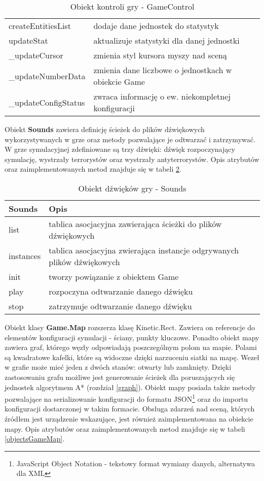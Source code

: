 \begin{table}
\begin{center}
\begin{tabular}{|p{}|p{}|}
	createEntitiesList & dodaje dane jednostek do statystyk\\
	updateStat & aktualizuje statystyki dla danej jednostki\\
	\_updateCursor & zmienia styl kursora myszy nad sceną\\
	\_updateNumberData & zmienia dane liczbowe o jednostkach w obiekcie Game\\
	\_updateConfigStatus & zwraca informację o ew. niekompletnej konfiguracji 
\\\hline
\end{tabular}
\caption {Obiekt kontroli gry - GameControl\label{objectsGameControl}}
\end{center}
\end{table} 

Obiekt \textbf{Sounds} zawiera definicję ścieżek do plików dźwiękowych wykorzystywanych w grze oraz metody pozwalające je odtwarzać i zatrzymywać. W grze symulacyjnej zdefiniowane są trzy dźwięki: dźwięk rozpoczynający symulację, wystrzały terrorystów oraz wystrzały antyterrorystów. Opis atrybutów oraz zaimplementowanych metod znajduje się w tabeli \ref{objectsSounds}. 

\begin{table}
\begin{center}
\begin{tabular}{|p{}|p{}|}
\hline
\textbf{Sounds} & Opis\\\hline		
	list & tablica asocjacyjna zawierająca ścieżki do plików dźwiękowych\\
	instances & tablica asocjacyjna zwierająca instancje odgrywanych plików dźwiękowych
\\\hline
	init & tworzy powiązanie z obiektem Game\\
	play & rozpoczyna odtwarzanie danego dźwięku\\
	stop & zatrzymuje odtwarzanie danego dźwięku
\\\hline
\end{tabular}
\caption {Obiekt dźwięków gry - Sounds\label{objectsSounds}}
\end{center}
\end{table} 

Obiekt klasy \textbf{Game.Map} rozszerza klasę Kinetic.Rect. Zawiera on referencje do elementów konfiguracji symulacji - ściany, punkty kluczowe. Ponadto obiekt mapy zawiera graf, którego węzły odpowiadają poszczególnym polom na mapie. Polami są kwadratowe kafelki, które są widoczne dzięki narzuceniu siatki na mapę. Wezeł w grafie może mieć jeden z dwóch stanów: otwarty lub zamknięty. Dzięki zastosowaniu grafu możliwe jest generowanie ścieżek dla poruszających się jednostek algorytmem A* (rozdział \ref{graph}). Obiekt mapy posiada także metody pozwalające na serializowanie konfiguracji do formatu JSON\footnote{JavaScript Object Notation - tekstowy format wymiany danych, alternatywa dla XML} oraz do importu konfiguracji dostarczonej w takim formacie. Obsługa zdarzeń nad sceną, których źródłem jest urządzenie wskazujące, jest również zaimplementowana na obiekcie mapy. Opis atrybutów oraz zaimplementowanych metod znajduje się w tabeli \ref{objectsGameMap}.  

